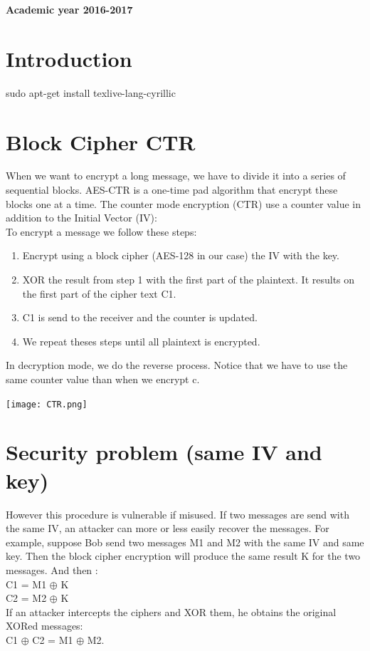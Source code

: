 \documentclass[a4paper,10pt]{article}
\begin{document}
\begin{titlepage}
\begin{center}
		\textbf{Academic year 2016-2017}

        
    \end{center}
\end{titlepage}
\newpage
\tableofcontents
\pagebreak

\section{Introduction}

sudo apt-get install texlive-lang-cyrillic

\section{Block Cipher CTR}
When we want to encrypt a long message, we have to divide it into a series of sequential blocks. AES-CTR is a one-time pad algorithm that encrypt these blocks one at a time. The counter mode encryption (CTR) use a counter value in addition to the Initial Vector (IV):\\
To encrypt a message we follow these steps:
\begin{enumerate}
	\item  Encrypt using a block cipher (AES-128 in our case) the IV with the key.
	\item  XOR the result from step 1 with the first part of the plaintext. It results on the first part of the cipher text C1.
	\item  C1 is send to the receiver and the counter is updated.
	\item  We repeat theses steps until all plaintext is encrypted.
\end{enumerate}
In decryption mode, we do the reverse process. Notice that we have to use the same counter value than when we encrypt c.

\texttt{[image: CTR.png]}

\section{Security problem (same IV and key)}
However this procedure is vulnerable if misused. If two messages are send with the same IV, an attacker can more or less easily recover the messages. For example, suppose Bob send two messages M1 and M2 with the same IV and same key. Then the block cipher encryption will produce the same result K for the two messages. And then : \\
C1 = M1 $\oplus$ K \\
C2  = M2 $\oplus$ K \\
If an attacker intercepts the ciphers and XOR them, he obtains the original XORed messages:\\
C1 $\oplus$ C2 = M1 $\oplus$ M2.
\end{document}
